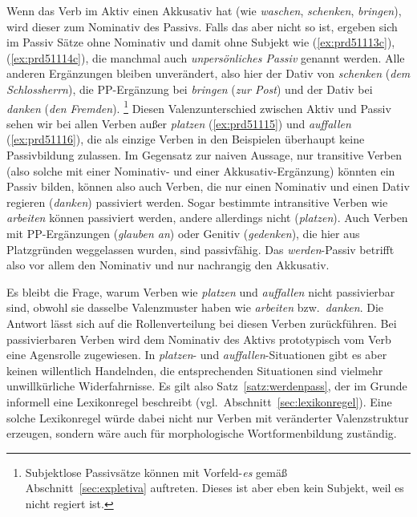 Wenn das Verb im Aktiv einen Akkusativ hat (wie \textit{waschen}, \textit{schenken}, \textit{bringen}), wird dieser zum Nominativ des Passivs.
Falls das aber nicht so ist, ergeben sich im Passiv Sätze ohne Nominativ und damit ohne Subjekt wie (\ref{ex:prd51113c}), (\ref{ex:prd51114c}), die manchmal auch \textit{unpersönliches Passiv} genannt werden.
Alle anderen Ergänzungen bleiben unverändert, also hier der Dativ von \textit{schenken} (\textit{dem Schlossherrn}), die PP-Ergänzung bei \textit{bringen} (\textit{zur Post}) und der Dativ bei \textit{danken} (\textit{den Fremden}).%
\footnote{Subjektlose Passivsätze können mit Vorfeld-\textit{es} gemäß Abschnitt~\ref{sec:expletiva} auftreten.
Dieses ist aber eben kein Subjekt, weil es nicht regiert ist.}
Diesen Valenzunterschied zwischen Aktiv und Passiv sehen wir bei allen Verben außer \textit{platzen} (\ref{ex:prd51115}) und \textit{auffallen} (\ref{ex:prd51116}), die als einzige Verben in den Beispielen überhaupt keine Passivbildung zulassen.
Im Gegensatz zur naiven Aussage, nur transitive Verben (also solche mit einer Nominativ- und einer Akkusativ-Ergänzung) könnten ein Passiv bilden, können also \zB auch Verben, die nur einen Nominativ und einen Dativ regieren (\textit{danken}) passiviert werden.
Sogar bestimmte intransitive Verben wie \textit{arbeiten} können passiviert werden, andere allerdings nicht (\textit{platzen}).
Auch Verben mit PP-Ergänzungen (\textit{glauben an}) oder Genitiv (\textit{gedenken}), die hier aus Platzgründen weggelassen wurden, sind passivfähig.
Das \textit{werden}-Passiv betrifft also vor allem den Nominativ und nur nachrangig den Akkusativ.

Es bleibt die Frage, warum Verben wie \textit{platzen} und \textit{auffallen} nicht passivierbar sind, obwohl sie dasselbe Valenzmuster haben wie \textit{arbeiten} bzw.\ \textit{danken}.
Die Antwort lässt sich auf die Rollenverteilung bei diesen Verben zurückführen.
Bei passivierbaren Verben wird dem Nominativ des Aktivs prototypisch vom Verb eine Agensrolle zugewiesen.
In \textit{platzen}- und \textit{auffallen}-Situationen gibt es aber keinen willentlich Handelnden, die entsprechenden Situationen sind vielmehr unwillkürliche Widerfahrnisse.
Es gilt also Satz~\ref{satz:werdenpass}, der im Grunde informell eine Lexikonregel beschreibt (vgl.\ Abschnitt~\ref{sec:lexikonregel}).
Eine solche Lexikonregel würde dabei nicht nur Verben mit veränderter Valenzstruktur erzeugen, sondern wäre auch für morphologische Wortformenbildung zuständig.



